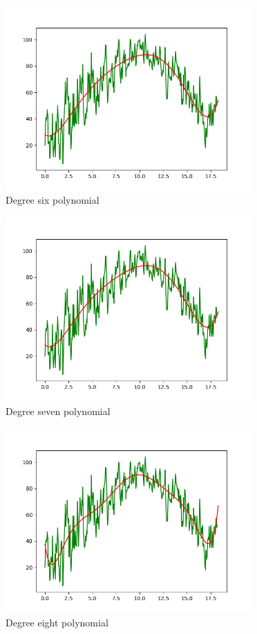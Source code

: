 \documentclass{article}
\begin{document}
\begin{figure}[H]
    \centering
    \includegraphics[height=200pt]{6poly_270.png}
    \caption{Degree six polynomial}
\end{figure}
\begin{figure}[H]
    \centering
    \includegraphics[height=200pt]{7poly_270.png}
    \caption{Degree seven polynomial}
\end{figure}
\begin{figure}[H]
    \centering
    \includegraphics[height=200pt]{8poly_270.png}
    \caption{Degree eight polynomial}
\end{figure}
\end{document}
